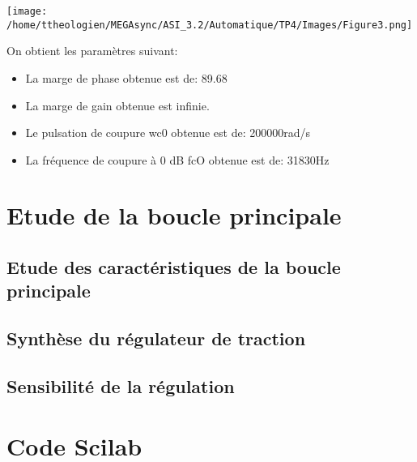 \documentclass[a4paper,12pt]{article}
\begin{document}
			\begin{center}
				\texttt{[image: /home/ttheologien/MEGAsync/ASI\_3.2/Automatique/TP4/Images/Figure3.png]}
			\end{center}

			On obtient les paramètres suivant:
			\begin{itemize}
				\item La marge de phase obtenue est de: 89.68\degre
				\item La marge de gain obtenue est infinie.
				\item Le pulsation de coupure wc0 obtenue est de: 200000rad/s
				\item La fréquence de coupure à 0 dB fcO obtenue est de: 31830Hz
			\end{itemize}

	\newpage

	\section{Etude de la boucle principale}
		\subsection{Etude des caractéristiques de la boucle principale}

		\subsection{Synthèse du régulateur de traction}

		\subsection{Sensibilité de la régulation}
	\newpage
	\section{Code Scilab}
\end{document}
